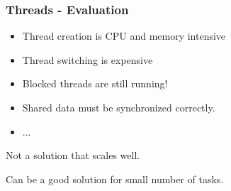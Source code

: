 \documentclass[aspectratio=169]{beamer}
\newif\iftransitions
\newcommand{\cpause}{\iftransitions \pause \fi}
\begin{document}
\begin{frame}
  \frametitle{Threads - Evaluation}

  \cpause
  \begin{itemize}
  \item Thread creation is CPU and memory intensive \cpause
  \item Thread switching is expensive \cpause
  \item Blocked threads are still running! \cpause
  \item Shared data must be synchronized correctly. \cpause
  \item ... \cpause
  \end{itemize}
  
  Not a solution that scales well.
  
  Can be a good solution for small number of tasks.
\end{frame}
\end{document}
